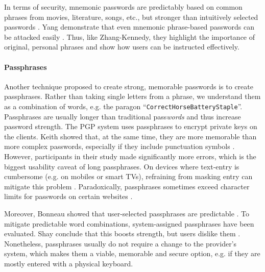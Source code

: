 	In terms of security, mnemonic passwords are predictably based on common phrases from movies, literature, songs, etc., but stronger than intuitively selected passwords \cite{Kuo2006HumanSelectionMnemonic}. Yang \etal demonstrate that even mnemonic phrase-based passwords can be attacked easily \cite{Yang2016MnemonicSentenceBased}. Thus, like Zhang-Kennedy, they highlight the importance of original, personal phrases and show how users can be instructed effectively.
		
	
	\paragraph{Passphrases}\label{sec:rw:passphrases}
	Another technique proposed to create strong, memorable passwords is to create passphrases. Rather than taking single letters from a phrase, we understand them as a combination of words, e.g. the paragon ``\texttt{CorrectHorseBatteryStaple}''. Passphrases are usually longer than traditional pass\textit{words} and thus increase password strength. The PGP system uses passphrases to encrypt private keys on the clients. Keith \etal showed that, at the same time, they are more memorable than more complex passwords, especially if they include punctuation symbols \cite{Keith2009PassphraseDesign}. However, participants in their study made significantly more errors, which is the biggest usability caveat of long passphrases. On devices where text-entry is cumbersome (e.g. on mobiles or smart TVs), refraining from masking entry can mitigate this problem \cite{Melicher2016UsabilityMobileTextPasswords}. Paradoxically, passphrases sometimes exceed character limits for passwords on certain websites \cite{Carnavalet2014AnalyzingPWStrengthMeters}. 
	
	Moreover, Bonneau showed that user-selected passphrases are predictable \cite{Bonneau2012LinguisticProperties}. To mitigate predictable word combinations, system-assigned passphrases have been evaluated. Shay \etal conclude that this boosts strength, but users dislike them \cite{Shay2012CorrectHorseBatteryStaple}. Nonetheless, passphrases usually do not require a change to the provider's system, which makes them a viable, memorable and secure option, e.g. if they are mostly entered with a physical keyboard. 
	
